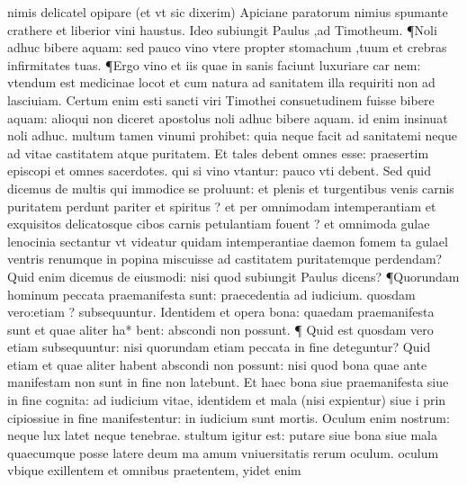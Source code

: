 \documentclass{article}
\begin{document}
\begin{pages}
nimis delicatel opipare (et vt sic dixerim) Apiciane paratorum nimius spumante crathere et liberior vini haustus. Ideo subiungit Paulus ,ad Timotheum. ¶Noli adhuc bibere aquam: sed pauco vino vtere propter stomachum ,tuum et crebras infirmitates tuas. ¶Ergo vino et iis quae in sanis faciunt luxuriare car nem: vtendum est medicinae locot et cum natura ad sanitatem illa requiriti non ad lasciuiam. Certum enim esti sancti viri Timothei consuetudinem fuisse bibere aquam: alioqui non diceret apostolus noli adhuc bibere aquam. id enim insinuat noli adhuc. multum tamen vinumi prohibet: quia neque facit ad sanitatemi neque ad vitae castitatem atque puritatem. Et tales debent omnes esse: praesertim episcopi et omnes sacerdotes. qui si vino vtantur: pauco vti debent. Sed quid dicemus de multis qui immodice se proluunt: et plenis et turgentibus venis carnis puritatem perdunt pariter et spiritus ? et per omnimodam intemperantiam et exquisitos delicatosque cibos carnis petulantiam fouent ? et omnimoda gulae lenocinia sectantur vt videatur quidam intemperantiae daemon fomem ta gulael ventris renumque in popina miscuisse ad castitatem puritatemque perdendam? Quid enim dicemus de eiusmodi: nisi quod subiungit Paulus dicens? ¶Quorundam hominum peccata praemanifesta sunt: praecedentia ad iudicium. quosdam vero:etiam ? subsequuntur. Identidem et opera bona: quaedam praemanifesta sunt et quae aliter ha* bent: abscondi non possunt. ¶ Quid est quosdam vero etiam subsequuntur: nisi quorundam etiam peccata in fine deteguntur? Quid etiam et quae aliter habent abscondi non possunt: nisi quod bona quae ante manifestam non sunt in fine non latebunt. Et haec bona siue praemanifesta siue in fine cognita: ad iudicium vitae, identidem et mala (nisi expientur) siue i prin cipiossiue in fine manifestentur: in iudicium sunt mortis. Oculum enim nostrum: neque lux latet  neque tenebrae. stultum igitur est: putare siue bona siue mala quaecumque posse latere deum ma amum vniuersitatis rerum oculum. oculum vbique exillentem et omnibus praetentem, yidet enim  \pend

\end{pages}
\end{document}
